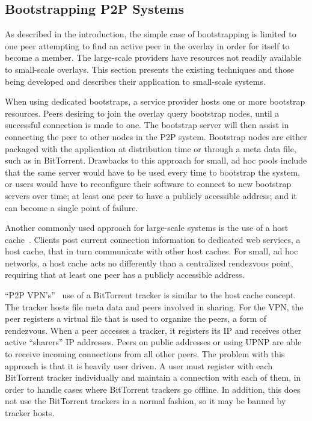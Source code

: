 \documentclass[conference]{IEEEtran}
\begin{document}
\subsection{Bootstrapping P2P Systems}

As described in the introduction, the simple case of bootstrapping is limited
to one peer attempting to find an active peer in the overlay in order for
itself to become a member.  The large-scale providers have resources not
readily available to small-scale overlays.  This section presents the existing
techniques and those being developed and describes their application to
small-scale systems.

When using dedicated bootstraps, a service provider hosts one or more bootstrap
resources.  Peers desiring to join the overlay query bootstrap nodes, until a
successful connection is made to one.  The bootstrap server will then assist in
connecting the peer to other nodes in the P2P system.  Bootstrap nodes are
either packaged with the application at distribution time or through a meta
data file, such as in BitTorrent.  Drawbacks to this approach for small, ad hoc
pools include that the same server would have to be used every time to
bootstrap the system, or users would have to reconfigure their software to
connect to new bootstrap servers over time; at least one peer to have a
publicly accessible address; and it can become a single point of failure.

Another commonly used approach for large-scale systems is the use of a host
cache~\cite{host_cache}.  Clients post current connection information to
dedicated web services, a host cache, that in turn communicate with other host
caches.  For small, ad hoc networks, a host cache acts no differently than a
centralized rendezvous point, requiring that at least one peer has a publicly
accessible address.

``P2P VPN's''~\cite{p2pvpn} use of a BitTorrent tracker is similar to the host
cache concept.  The tracker hosts file meta data and peers involved in sharing.
For the VPN, the peer registers a virtual file that is used to organize the
peers, a form of rendezvous.  When a peer accesses a tracker, it registers its
IP and receives other active ``sharers'' IP addresses.  Peers on public
addresses or using UPNP are able to receive incoming connections from all other
peers.  The problem with this approach is that it is heavily user driven.  A
user must register with each BitTorrent tracker individually and maintain a
connection with each of them, in order to handle cases where BitTorrent
trackers go offline.  In addition, this does not use the BitTorrent trackers in
a normal fashion, so it may be banned by tracker hosts.
\end{document}
